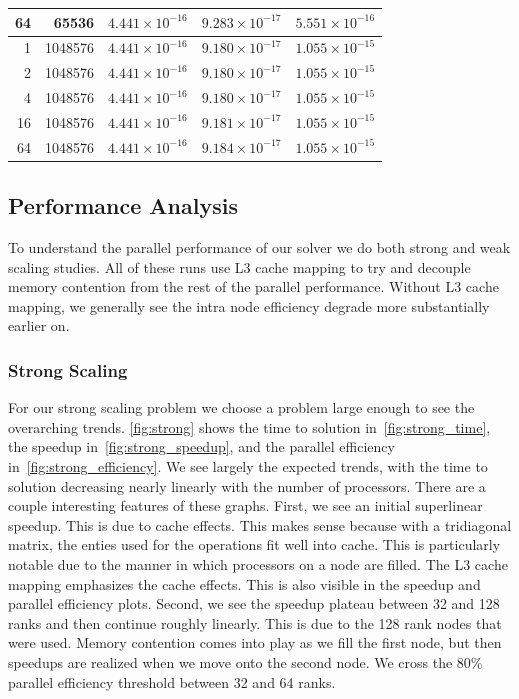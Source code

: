 \documentclass[11pt]{article}
\begin{document}
\begin{table}[htbp]
\begin{tabular}{rrccc}
    64  & 65536   & $4.441\times10^{-16}$ & $9.283\times10^{-17}$    & $5.551\times10^{-16}$            \\
    \midrule
    1   & 1048576 & $4.441\times10^{-16}$ & $9.180\times10^{-17}$    & $1.055\times10^{-15}$            \\
    2   & 1048576 & $4.441\times10^{-16}$ & $9.180\times10^{-17}$    & $1.055\times10^{-15}$            \\
    4   & 1048576 & $4.441\times10^{-16}$ & $9.180\times10^{-17}$    & $1.055\times10^{-15}$            \\
    16  & 1048576 & $4.441\times10^{-16}$ & $9.181\times10^{-17}$    & $1.055\times10^{-15}$            \\
    64  & 1048576 & $4.441\times10^{-16}$ & $9.184\times10^{-17}$    & $1.055\times10^{-15}$            \\
    \bottomrule
  \end{tabular}
\end{table}

\subsection*{Performance Analysis}
To understand the parallel performance of our solver we do both strong and weak scaling studies.
All of these runs use L3 cache mapping to try and decouple memory contention from the rest of the parallel performance.
Without L3 cache mapping, we generally see the intra node efficiency degrade more substantially earlier on.



\subsubsection*{Strong Scaling}
For our strong scaling problem we choose a problem large enough to see the overarching trends.
\cref{fig:strong} shows the time to solution in~\cref{fig:strong_time}, the speedup in~\cref{fig:strong_speedup}, and the parallel efficiency in~\cref{fig:strong_efficiency}.
We see largely the expected trends, with the time to solution decreasing nearly linearly with the number of processors.
There are a couple interesting features of these graphs. First, we see an initial superlinear speedup.
This is due to cache effects. This makes sense because with a tridiagonal matrix, the enties used for the operations fit well into cache.
This is particularly notable due to the manner in which processors on a node are filled. The L3 cache mapping emphasizes the cache effects.
This is also visible in the speedup and parallel efficiency plots.
Second, we see the speedup plateau between 32 and 128 ranks and then continue roughly linearly.
This is due to the 128 rank nodes that were used. Memory contention comes into play as we fill the first node, but then speedups are realized when we move onto the second node.
We cross the 80\% parallel efficiency threshold between 32 and 64 ranks.
\end{document}
